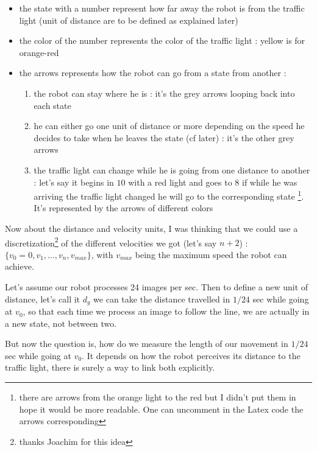 \documentclass{article}
\begin{document}
    \begin{itemize}
    \item the state with a number represent how far away the robot is from the traffic light (unit of distance are to be defined as explained later)
    \item the color of the number represents the color of the traffic light : yellow is for orange-red 
    \item the arrows represents how the robot can go from a state from another :
    \begin{enumerate}
    \item the robot can stay where he is : it's the grey arrows looping back into each state
    \item he can either go one unit of distance or more depending on the speed he decides to take when he leaves the state (cf later) : it's the other grey arrows
    \item the traffic light can change while he is going from one distance to another : let's say it begins in $10$ with a red light and goes to $8$ if while he was arriving the traffic light changed he will go to the corresponding state \footnote{there are arrows from the orange light to the red but I didn't put them in hope it would be more readable. One can uncomment in the Latex code the arrows corresponding}. It's represented by the arrows of different colors
    \end{enumerate}
    \end{itemize}   

    
    
    
    Now about the distance and velocity units, I was thinking that we could use a discretization\footnote{thanks Joachim for this idea} of the different velocities we got (let's say $n+2$) : $\{v_0=0,v_1,\ldots,v_n,v_{max}\}$, with $v_{max}$ being the maximum speed the robot can achieve.
    
    Let's assume our robot processes 24 images per sec.
    Then to define a new unit of distance, let's call it $d_{g}$ we can take the distance travelled in $1/24$ sec while going at $v_0$, so that each time we process an image to follow the line, we are actually in a new state, not between two.
    
    
    But now the question is, how do we measure the length of our movement in $1/24$ sec while going at $v_0$. It depends on how the robot perceives its distance to the traffic light, there is surely a way to link both explicitly.
    
    
    
    
    
\end{document}
